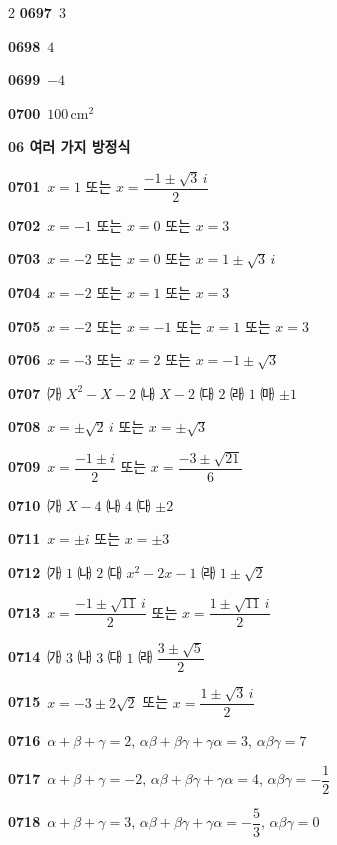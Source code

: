 \documentclass[10pt,a4paper]{article}
\begin{document}
\begin{multicols}{2}
\noindent\textbf{0697}\ $3$\par
\noindent\textbf{0698}\ $4$\par
\noindent\textbf{0699}\ $-4$\par
\noindent\textbf{0700}\ $100\,\mathrm{cm}^2$\par
\noindent\textbf{06 여러 가지 방정식}\par\smallskip
\noindent\textbf{0701}\ $x=1$ 또는 $x=\dfrac{-1\pm\sqrt{3}\,i}{2}$\par
\noindent\textbf{0702}\ $x=-1$ 또는 $x=0$ 또는 $x=3$\par
\noindent\textbf{0703}\ $x=-2$ 또는 $x=0$ 또는 $x=1\pm\sqrt{3}\,i$\par
\noindent\textbf{0704}\ $x=-2$ 또는 $x=1$ 또는 $x=3$\par
\noindent\textbf{0705}\ $x=-2$ 또는 $x=-1$ 또는 $x=1$ 또는 $x=3$\par
\noindent\textbf{0706}\ $x=-3$ 또는 $x=2$ 또는 $x=-1\pm\sqrt{3}$\par
\noindent\textbf{0707}\ ㈎ $X^2-X-2$ \quad ㈏ $X-2$ \quad ㈐ $2$ \quad ㈑ $1$ \quad ㈒ $\pm 1$\par
\noindent\textbf{0708}\ $x=\pm\sqrt{2}\,i$ 또는 $x=\pm\sqrt{3}$\par
\noindent\textbf{0709}\ $x=\dfrac{-1\pm i}{2}$ 또는 $x=\dfrac{-3\pm\sqrt{21}}{6}$\par
\noindent\textbf{0710}\ ㈎ $X-4$ \quad ㈏ $4$ \quad ㈐ $\pm 2$\par
\noindent\textbf{0711}\ $x=\pm i$ 또는 $x=\pm 3$\par
\noindent\textbf{0712}\ ㈎ $1$ \quad ㈏ $2$ \quad ㈐ $x^2-2x-1$ \quad ㈑ $1\pm\sqrt{2}$\par
\noindent\textbf{0713}\ $x=\dfrac{-1\pm\sqrt{11}\,i}{2}$ 또는 $x=\dfrac{1\pm\sqrt{11}\,i}{2}$\par
\noindent\textbf{0714}\ ㈎ $3$ \quad ㈏ $3$ \quad ㈐ $1$ \quad ㈑ $\dfrac{3\pm\sqrt{5}}{2}$\par
\noindent\textbf{0715}\ $x=-3\pm 2\sqrt{2}$ 또는 $x=\dfrac{1\pm\sqrt{3}\,i}{2}$\par
\noindent\textbf{0716}\ $\alpha+\beta+\gamma=2$, $\alpha\beta+\beta\gamma+\gamma\alpha=3$, $\alpha\beta\gamma=7$\par
\noindent\textbf{0717}\ $\alpha+\beta+\gamma=-2$, $\alpha\beta+\beta\gamma+\gamma\alpha=4$, $\alpha\beta\gamma=-\dfrac{1}{2}$\par
\noindent\textbf{0718}\ $\alpha+\beta+\gamma=3$, $\alpha\beta+\beta\gamma+\gamma\alpha=-\dfrac{5}{3}$, $\alpha\beta\gamma=0$\par

\end{multicols}
\end{document}
